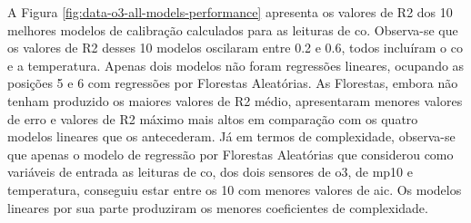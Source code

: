 A Figura \ref{fig:data-o3-all-models-performance} apresenta os valores de R2 dos 10 melhores modelos de calibração calculados para as leituras de \acrshort{co}. Observa-se que os valores de R2 desses 10 modelos oscilaram entre 0.2 e 0.6, todos incluíram o \acrshort{co} e a temperatura. Apenas dois modelos não foram regressões lineares, ocupando as posições 5 e 6 com regressões por Florestas Aleatórias. As Florestas, embora não tenham produzido os maiores valores de R2 médio, apresentaram menores valores de erro e valores de R2 máximo mais altos em comparação com os quatro modelos lineares que os antecederam. Já em termos de complexidade, observa-se que apenas o modelo de regressão por Florestas Aleatórias que considerou como variáveis de entrada as leituras de \acrshort{co}, dos dois sensores de \acrshort{o3}, de \acrshort{mp10} e temperatura, conseguiu estar entre os 10 com menores valores de \acrshort{aic}. Os modelos lineares por sua parte produziram os menores coeficientes de complexidade.

